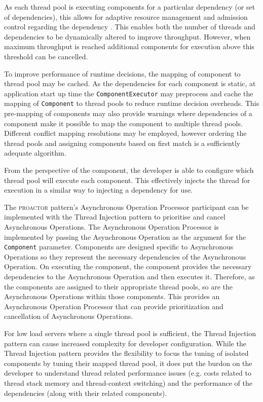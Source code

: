 \documentclass[prodmode]{style/acmlarge}
\begin{document}
As each thread pool is executing components for a particular dependency (or set
of dependencies), this allows for adaptive resource management and admission
control regarding the dependency \cite{seda}.  This enables both the number of
threads and dependencies to be dynamically altered to improve throughput.
However, when maximum throughput is reached additional components for execution
above this threshold can be cancelled.

To improve performance of runtime decisions, the mapping of component to thread
pool may be cached.  As the dependencies for each component is static, at
application start up time the \texttt{ComponentExecutor} may preprocess and
cache the mapping of \texttt{Component} to thread pools to reduce runtime
decision overheads.  This pre-mapping of components may also provide warnings
where dependencies of a component make it possible to map the component to
multiple thread pools.  Different conflict mapping resolutions may be employed,
however ordering the thread pools and assigning components based on first match
is a sufficiently adequate algorithm.

From the perspective of the component, the developer is able to configure which
thread pool will execute each component.  This effectively injects the thread
for execution in a similar way to injecting a dependency for use.

The \textsc{proactor} pattern's Asynchronous Operation Processor participant can
be implemented with the Thread Injection pattern to prioritise and cancel
Asynchronous Operations.  The Asynchronous Operation Processor is implemented by
passing the Asynchronous Operation as the argument for the \texttt{Component}
parameter.  Components are designed specific to Asynchronous Operations so they
represent the necessary dependencies of the Asynchronous Operation.  On
executing the component, the component provides the necessary dependencies to
the Asynchronous Operation and then executes it.  Therefore, as the components
are assigned to their appropriate thread pools, so are the Asynchronous
Operations within those components.  This provides an Asynchronous Operation
Processor that can provide prioritization and cancellation of Asynchronous
Operations.

For low load servers where a single thread pool is sufficient, the Thread
Injection pattern can cause increased complexity for developer configuration.
While the Thread Injection pattern provides the flexibility to focus the tuning
of isolated components by tuning their mapped thread pool, it does put the
burdon on the developer to understand thread related performance issues (e.g.
costs related to thread stack memory and thread-context switching) and the
performance of the dependencies (along with their related components).
\end{document}

